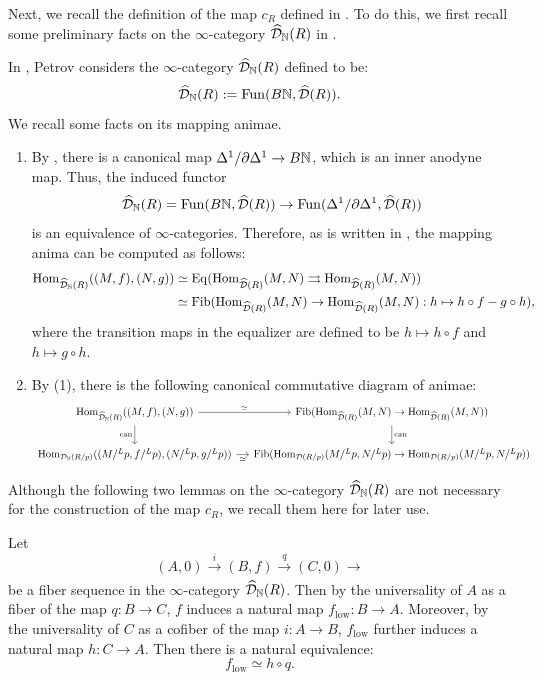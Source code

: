 \documentclass[11pt,a4paper]{amsart}
\begin{document}
Next, we recall the definition of the map $c_R$ defined in \cite{petrov2025Nondecomposability}. To do this, we first recall some preliminary facts on the $\infty$-category $\widehat{\mathcal{D}}_{\mathbb{N}}(R)$ in \cite[Section 6.1]{petrov2025Nondecomposability}.
\begin{remark}\label{remark2.4new}
    In \cite{petrov2025Nondecomposability}, Petrov considers the $\infty$-category $\widehat{\mathcal{D}}_{\mathbb{N}}(R)$ defined to be:
    \[\widehat{\mathcal{D}}_{\mathbb{N}}(R):=\operatorname{Fun}(B\mathbb{N},\widehat{\mathcal{D}}(R)).\] We recall some facts on its mapping animae.
    \begin{enumerate}
        \item By , there is a canonical map $\Delta^1/\partial\Delta^1\to B\mathbb{N}$, which is an inner anodyne map. Thus, the induced functor \[\widehat{\mathcal{D}}_{\mathbb{N}}(R)=\operatorname{Fun}(B\mathbb{N},\widehat{\mathcal{D}}(R))\to \operatorname{Fun}(\Delta^1/\partial\Delta^1,\widehat{\mathcal{D}}(R))\] is an equivalence of $\infty$-categories. Therefore, as is written in \cite[Section 6.1]{petrov2025Nondecomposability}, the mapping anima can be computed as follows:
        \begin{align*}
        \operatorname{Hom}_{\widehat{\mathcal{D}}_{\mathbb{N}}(R)}((M,f),(N,g))&\simeq \operatorname{Eq}(\operatorname{Hom}_{\widehat{\mathcal{D}}(R)}(M,N)\rightrightarrows \operatorname{Hom}_{\widehat{\mathcal{D}}(R)}(M,N))\\
        &\simeq \operatorname{Fib}(\operatorname{Hom}_{\widehat{\mathcal{D}}(R)}(M,N)\to \operatorname{Hom}_{\widehat{\mathcal{D}}(R)}(M,N):h\mapsto h\circ f-g\circ h),
        \end{align*}
        where the transition maps in the equalizer are defined to be $h\mapsto h\circ f$ and $h\mapsto g\circ h$.
        \item By (1), there is the following canonical commutative diagram of animae:
        \[ \begin{tikzcd}[column sep=small]
        \Hom_{\widehat{\mcalD}_\setN(R)}((M,f),(N,g)) \arrow[r, "\simeq "] \arrow[d, "\can"'] & \Fib(\Hom_{\widehat{\mcalD}(R)}(M,N)\to \Hom_{\widehat{\mcalD}(R)}(M,N)) \arrow[d, "\can"] \\ \Hom_{\mcalD_\setN(R/p)}((M/^Lp,f/^Lp),(N/^Lp,g/^Lp)) \arrow[r, "\simeq"'] & \Fib(\Hom_{\mcalD(R/p)}(M/^Lp,N/^Lp)\to \Hom_{\mcalD(R/p)}(M/^Lp,N/^Lp)) \end{tikzcd} \] 
        \end{enumerate}
\end{remark}
Although the following two lemmas on the $\infty$-category $\widehat{\mathcal{D}}_{\mathbb{N}}(R)$ are not necessary for the construction of the map $c_R$, we recall them here for later use.
\begin{lemma}\label{remark2.8}
    Let \[(A,0)\xrightarrow[]{i} (B,f)\xrightarrow[]{q} (C,0)\to \] be a fiber sequence in the $\infty$-category $\widehat{\mathcal{D}}_{\mathbb{N}}(R)$. Then by the universality of $A$ as a fiber of the map $q:B\to C$, $f$ induces a natural map $f_{\mathrm
    {low}}:B\to A$. Moreover, by the universality of $C$ as a cofiber of the map $i:A\to B$, $f_\mathrm{low}$ further induces a natural map $h:C\to A$. Then there is a natural equivalence:
    \[f_\mathrm{low}\simeq h\circ q.\]
\end{lemma}
\end{document}
